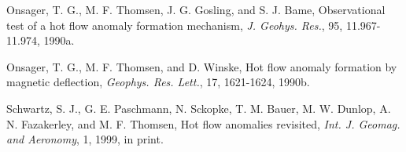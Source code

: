 \begin{article}
\begin{references}

Onsager, T. G., M. F. Thomsen, J. G. Gosling, and S. J.
Bame, Observational test of a hot flow anomaly formation
mechanism, {\it J. Geohys. Res.}, 95, 11.967-11.974, 1990a.

Onsager, T. G., M. F. Thomsen, and D. Winske,
Hot flow anomaly formation by magnetic deflection,
{\it Geophys. Res. Lett.}, 17, 1621-1624, 1990b.

Schwartz, S. J., G. E. Paschmann, N. Sckopke, T. M. Bauer, M. W.
Dunlop, A. N. Fazakerley, and M. F. Thomsen,  Hot flow anomalies
revisited, {\it Int. J. Geomag. and Aeronomy}, 1, 1999, in print.

\end{references}







\end{article}



